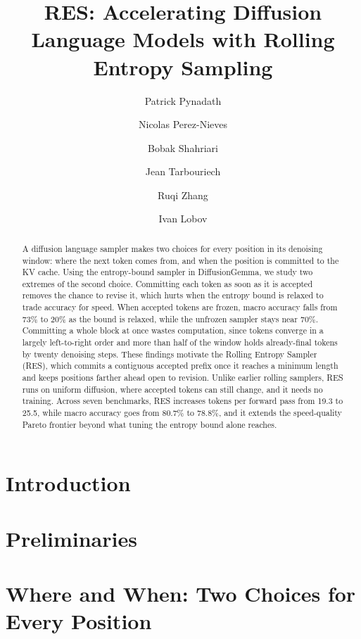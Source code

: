 \documentclass[11pt, a4paper, logo, copyright, gdm]{google}
\title{RES: Accelerating Diffusion Language Models with Rolling Entropy Sampling}
\author[1,*]{Patrick Pynadath}
\author[2]{Nicolas Perez-Nieves}
\author[2]{Bobak Shahriari}
\author[2]{Jean Tarbouriech}
\author[1]{Ruqi Zhang}
\author[*]{Ivan Lobov}
\affil[1]{Purdue University}
\affil[2]{Google DeepMind}
\affil[*]{Work done while at Google DeepMind.}
\begin{document}
\newcommand{\algname}{RES}
\newcommand{\algabbrev}{RES}

\begin{abstract}
A diffusion language sampler makes two choices for every position in its denoising window: where the next token comes from, and when the position is committed to the KV cache.
Using the entropy-bound sampler in DiffusionGemma, we study two extremes of the second choice.
Committing each token as soon as it is accepted removes the chance to revise it, which hurts when the entropy bound is relaxed to trade accuracy for speed.
When accepted tokens are frozen, macro accuracy falls from 73\% to 20\% as the bound is relaxed, while the unfrozen sampler stays near 70\%.
Committing a whole block at once wastes computation, since tokens converge in a largely left-to-right order and more than half of the window holds already-final tokens by twenty denoising steps.
These findings motivate the Rolling Entropy Sampler (RES), which commits a contiguous accepted prefix once it reaches a minimum length and keeps positions farther ahead open to revision.
Unlike earlier rolling samplers, RES runs on uniform diffusion, where accepted tokens can still change, and it needs no training.
Across seven benchmarks, RES increases tokens per forward pass from 19.3 to 25.5, while macro accuracy goes from 80.7\% to 78.8\%, and it extends the speed-quality Pareto frontier beyond what tuning the entropy bound alone reaches.
\end{abstract}

\maketitle

\section{Introduction}
\label{sec:intro}


\section{Preliminaries}
\label{sec:prelims}


\section{Where and When: Two Choices for Every Position}
\label{sec:motivation}

\end{document}

